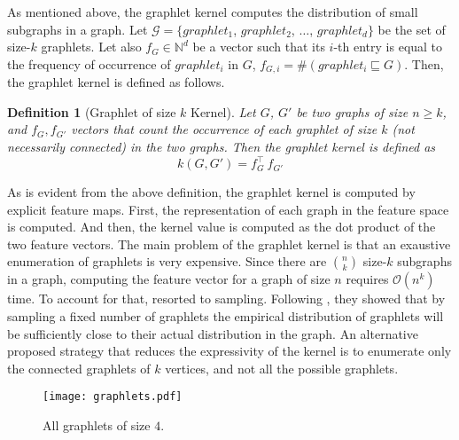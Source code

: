 \documentclass[twoside,11pt]{article}
\newtheorem{definition}{Definition}
\begin{document}
As mentioned above, the graphlet kernel computes the distribution of small subgraphs in a graph.
Let $\mathcal{G} = \{ graphlet_1$, $graphlet_2$, $\ldots$, $graphlet_d\}$ be the set of size-$k$ graphlets.
Let also $f_G \in \mathbb{N}^d$ be a vector such that its $i$-th entry is equal to the frequency of occurrence of $graphlet_i$ in $G$, $f_{G,i} = \#(graphlet_i \sqsubseteq G)$.
Then, the graphlet kernel is defined as follows.
\begin{definition}[Graphlet of size $k$ Kernel]
  Let $G$, $G'$ be two graphs of size $n \geq k$, and $f_{G}, f_{G'}$ vectors that count the occurrence of each graphlet of size $k$ (not necessarily connected) in the two graphs. 
  Then the graphlet kernel is defined as
  \begin{equation}
      k(G,G') = f_{G}^\top \ f_{G'}
    \end{equation}
\end{definition}
As is evident from the above definition, the graphlet kernel is computed by explicit feature maps.
First, the representation of each graph in the feature space is computed.
And then, the kernel value is computed as the dot product of the two feature vectors.
The main problem of the graphlet kernel is that an exaustive enumeration of graphlets is very expensive.
Since there are $\binom{n}{k}$ size-$k$ subgraphs in a graph, computing the feature vector for a graph of size $n$ requires $\mathcal{O}(n^k)$ time.
To account for that,  resorted to sampling. 
Following , they showed that by sampling a fixed number of graphlets the empirical distribution of graphlets will be sufficiently close to their actual distribution in the graph.  
An alternative proposed strategy that reduces the expressivity of the kernel is to enumerate only the connected graphlets of $k$ vertices, and not all the possible graphlets.

\begin{figure}[t]
    \centering
    \texttt{[image: graphlets.pdf]}
    \caption{All graphlets of size $4$.}
    \label{fig:graphlets}
\end{figure}
\end{document}

